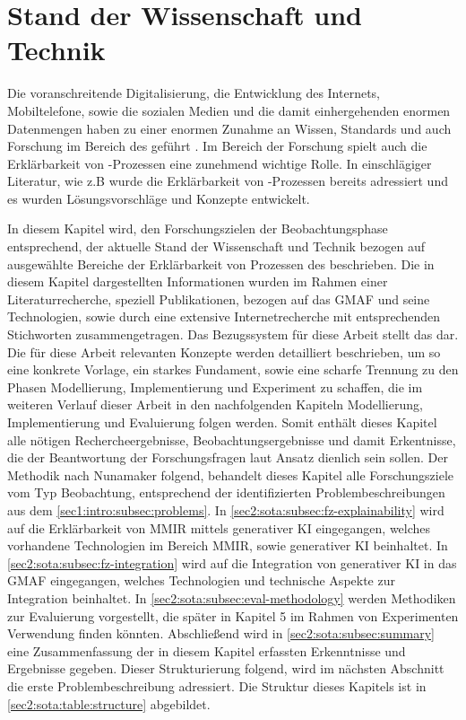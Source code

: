 \section{Stand der Wissenschaft und Technik}
\label{sec2:sota}
Die voranschreitende Digitalisierung, die Entwicklung des Internets, Mobiltelefone, sowie die sozialen Medien und die damit einhergehenden enormen Datenmengen haben zu einer enormen Zunahme an Wissen, Standards und auch Forschung im Bereich des \mmir{} geführt \cite{swa_diss}.
Im Bereich der Forschung spielt auch die Erklärbarkeit von \mmir{}-Prozessen eine zunehmend wichtige Rolle.
In einschlägiger Literatur, wie z.B \cite{swa_diss} wurde die Erklärbarkeit von \mmir{}-Prozessen bereits adressiert und es wurden Lösungsvorschläge und Konzepte entwickelt.

In diesem Kapitel wird, den Forschungszielen der Beobachtungsphase entsprechend, der aktuelle Stand der Wissenschaft und Technik bezogen auf ausgewählte Bereiche der Erklärbarkeit von Prozessen des \mmir{} beschrieben.
Die in diesem Kapitel dargestellten Informationen wurden im Rahmen einer Literaturrecherche, speziell Publikationen, bezogen auf das GMAF und seine Technologien, sowie durch eine extensive Internetrecherche mit entsprechenden Stichworten zusammengetragen.
Das Bezugssystem für diese Arbeit stellt das \gmaf{} dar.
Die für diese Arbeit relevanten Konzepte werden detailliert beschrieben, um so eine konkrete Vorlage, ein starkes Fundament, sowie eine scharfe Trennung zu den Phasen Modellierung, Implementierung und Experiment zu schaffen, die im weiteren Verlauf dieser Arbeit in den nachfolgenden Kapiteln Modellierung, Implementierung und Evaluierung folgen werden.
Somit enthält dieses Kapitel alle nötigen Rechercheergebnisse, Beobachtungsergebnisse und damit Erkentnisse, die der Beantwortung der Forschungsfragen laut Ansatz dienlich sein sollen.
Der Methodik nach Nunamaker \cite{nunamaker} folgend, behandelt dieses Kapitel alle Forschungsziele vom Typ Beobachtung, entsprechend der identifizierten Problembeschreibungen aus dem \cref{sec1:intro:subsec:problems}.
In \cref{sec2:sota:subsec:fz-explainability} wird auf die Erklärbarkeit von MMIR mittels generativer KI eingegangen, welches vorhandene Technologien im Bereich MMIR, sowie generativer KI beinhaltet.
In \cref{sec2:sota:subsec:fz-integration} wird auf die Integration von generativer KI in das GMAF eingegangen, welches Technologien und technische Aspekte zur Integration beinhaltet.
In \cref{sec2:sota:subsec:eval-methodology} werden Methodiken zur Evaluierung vorgestellt, die später in Kapitel 5 im Rahmen von Experimenten Verwendung finden könnten.
Abschließend wird in \cref{sec2:sota:subsec:summary} eine Zusammenfassung der in diesem Kapitel erfassten Erkenntnisse und Ergebnisse gegeben.
Dieser Strukturierung folgend, wird im nächsten Abschnitt die erste Problembeschreibung adressiert.
Die Struktur dieses Kapitels ist in \cref{sec2:sota:table:structure} abgebildet.


